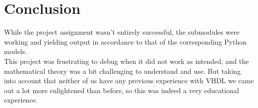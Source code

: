 \chapter{Conclusion}
While the project assignment wasn't entirely successful, the submodules were working and yielding output in accordance to that of the corresponding Python models. \\
This project was frustrating to debug when it did not work as intended, and the mathematical theory was a bit challenging to understand and use. But taking into account that neither of us have any previous experience with VHDL we came out a lot more enlightened than before, so this was indeed a very educational experience.

